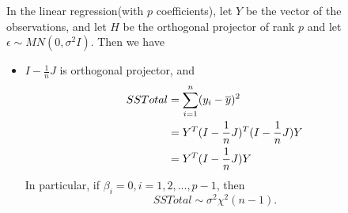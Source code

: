 \begin{refsection}
\begin{theorem}\label{ch:theory-of-statistics:th:variancedecompositionlinearregression}\cite[76]{montgomery2012introduction}
	In the linear regression(with $p$ coefficients), let $Y$ be the vector of the observations, and let $H$ be the orthogonal projector of rank $p$ and let $\epsilon \sim MN(0,\sigma^2 I)$. Then we have
	\begin{itemize}
		\item $I-\frac{1}{n}J$ is orthogonal projector, and 
		\begin{align*}
		SSTotal &= \sum_{i=1}^{n} (y_i - \overline{y})^2 \\
		&= Y^T(I-\frac{1}{n}J)^T(I-\frac{1}{n}J)Y\\
		&=Y^T(I-\frac{1}{n}J)Y
		\end{align*}
	In particular, if $\beta_i = 0,i=1,2,...,p-1$, then
	$$SSTotal \sim \sigma^2 \chi^2(n-1).$$	
		

\end{itemize}
\end{theorem}
\end{refsection}
